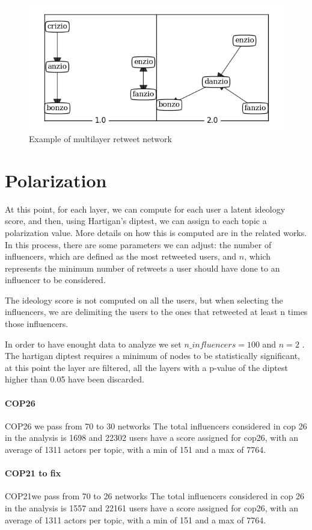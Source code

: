 \begin{figure}
    \centering
    \includegraphics[width=0.75\linewidth]{Chapter4/figures/projected_topics_ml.png}
    \caption{Example of multilayer retweet network }
    \label{fig:multilayer}
\end{figure}




\section{Polarization}
At this point, for each layer, we can compute for each user a latent ideology score, and then, using Hartigan's diptest, we can assign to each topic a polarization value. More details on how this is computed are in the related works.
In this process, there are some parameters we can adjust: the number of influencers, which are defined as the most retweeted users, and $n$, which represents the minimum number of retweets a user should have done to an influencer to be considered.

The ideology score is not computed on all the users, but when selecting the influencers, we are delimiting the users to the ones that retweeted at least n times those influencers. 

In order to have enought data to analyze we set $n\_influencers = 100$ and $n=2$ . The hartigan diptest requires a minimum of nodes to be statistically significant, at this point the layer are filtered, all the layers with a p-value of the diptest higher than  0.05 have been discarded. 

\paragraph{COP26 }
COP26 we pass from 70 to 30 networks
The total influencers considered  in cop 26 in the analysis is 1698 and 22302 users have a score assigned for cop26, with an average of 1311 actors per topic, with a min of 151 and a max of 7764.  

\paragraph{COP21 to fix}
COP21we pass from 70 to 26 networks
The total influencers considered  in cop 26 in the analysis is 1557 and 22161 users have a score assigned for cop26, with an average of 1311 actors per topic, with a min of 151 and a max of 7764.  

